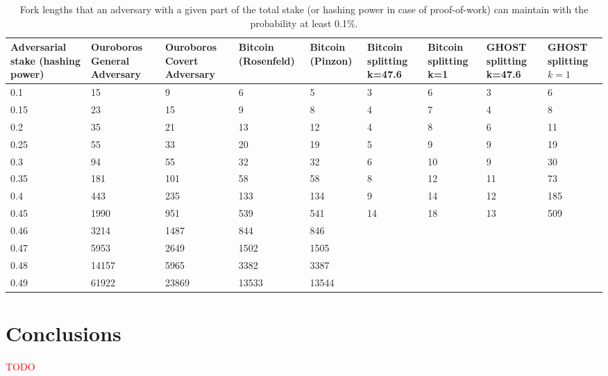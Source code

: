 \documentclass[10pt,a4paper]{article}
\newcommand\myworries[1]{\textcolor{red}{#1}}
\numberwithin{equation}{section} %
\theoremstyle{plain}
\theoremstyle{definition}
\theoremstyle{remark}
\begin{document}
	\begin{table}[h!]
        \label{tbl:fork_lengths_comparison}
        \centering
        \begin{tabular}{|p{1.6cm}||p{1.5cm}|p{1.5cm}|p{1cm}|p{1cm}|p{1cm}|p{1cm}|p{1.2cm}|p{1.2cm}|}
             \hline 
             Adversarial stake (hashing power) & Ouroboros General Adversary & Ouroboros Covert Adversary & Bitcoin (Rosenfeld) & Bitcoin (Pinzon) & Bitcoin splitting k=47.6 & Bitcoin splitting k=1 & GHOST splitting k=47.6 & GHOST splitting \(k=1\) \\
             \hline
             0.1   & 15     & 9     & 6     & 5     & 3  & 6  & 3   & 6     \\
             0.15  & 23     & 15    & 9     & 8     & 4  & 7  & 4   & 8     \\
             0.2   & 35     & 21    & 13    & 12    & 4  & 8  & 6   & 11    \\
             0.25  & 55     & 33    & 20    & 19    & 5  & 9  & 9   & 19    \\
             0.3   & 94     & 55    & 32    & 32    & 6  & 10 & 9   & 30    \\
             0.35  & 181    & 101   & 58    & 58    & 8  & 12 & 11  & 73    \\
             0.4   & 443    & 235   & 133   & 134   & 9  & 14 & 12  & 185   \\
             0.45  & 1990   & 951   & 539   & 541   & 14 & 18 & 13  & 509   \\
             0.46  & 3214   & 1487  & 844   & 846   &    &    &     &       \\
             0.47  & 5953   & 2649  & 1502  & 1505  &    &    &     &       \\
             0.48  & 14157  & 5965  & 3382  & 3387  &    &    &     &       \\
             0.49  & 61922  & 23869 & 13533 & 13544 &    &    &     &       \\
             \hline
        \end{tabular}
        \caption{Fork lengths that an adversary with a given part of the total stake (or hashing power in case of proof-of-work) can maintain with the probability at least 0.1\%.}
    \end{table}
	
	\section{Conclusions}
	
	\myworries{TODO}
	
    \printbibliography
	
\end{document}
